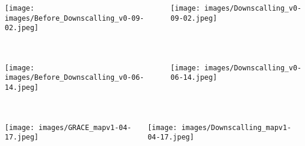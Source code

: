 \documentclass{beamer}
\begin{document}
  \begin{frame}
    \frametitle{}

    \begin{columns}

      \begin{column}{0.5\textwidth}
        \texttt{[image: images/Before\_Downscalling\_v0-09-02.jpeg]}
      \end{column}

      \begin{column}{0.5\textwidth}
        \centering
        \texttt{[image: images/Downscalling\_v0-09-02.jpeg]}
      \end{column}

    \end{columns}
  \end{frame}

  \begin{frame}
    \frametitle{}

    \begin{columns}

      \begin{column}{0.5\textwidth}
        \texttt{[image: images/Before\_Downscalling\_v0-06-14.jpeg]}
      \end{column}

      \begin{column}{0.5\textwidth}
        \centering
        \texttt{[image: images/Downscalling\_v0-06-14.jpeg]}
      \end{column}

    \end{columns}
  \end{frame}

  
  \begin{frame}
    \frametitle{}

    \begin{columns}

      \begin{column}{0.5\textwidth}
        \centering
        \texttt{[image: images/GRACE\_mapv1-04-17.jpeg]}
      \end{column}

      \begin{column}{0.5\textwidth}
        \texttt{[image: images/Downscalling\_mapv1-04-17.jpeg]}
      \end{column}

    \end{columns}

  \end{frame}
\end{document}
